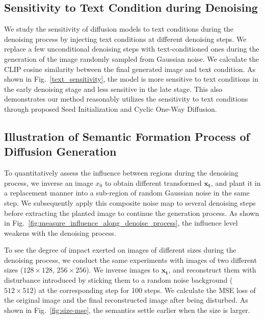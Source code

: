 \subsection{Sensitivity to Text Condition during Denoising}\label{sec:text-sensitivity}
We study the sensitivity of diffusion models to text conditions during the denoising process by injecting text conditions at different denoising steps. We replace a few unconditional denoising steps with text-conditioned ones during the generation of the image randomly sampled from Gaussian noise. We calculate the CLIP cosine similarity between the final generated image and text condition. As shown in Fig.~\ref{text_sensitivity}, the model is more sensitive to text conditions in the early denoising stage and less sensitive in the late stage. This also demonstrates our method reasonably utilizes the sensitivity to text conditions through proposed Seed Initialization and Cyclic One-Way Diffusion.

\subsection{Illustration of Semantic Formation Process of Diffusion Generation}\label{sec:diff-size_semantic_formation}

To quantitatively assess the influence between regions during the denoising process, we inverse an image $x_0$ to obtain different transformed $\mathbf{x_t}$, and plant it in a replacement manner into a sub-region of random Gaussian noise in the same step. We subsequently apply this composite noise map to several denoising steps before extracting the planted image to continue the generation process. As shown in Fig.~\ref{fig:measure_influence_along_denoise_process}, the influence level weakens with the denoising process. 

To see the degree of impact exerted on images of different sizes during the denoising process, we conduct the same experiments with images of two different sizes ($128\times128$, $256\times256$). We inverse images to $\mathbf{x_t}$, and reconstruct them with disturbance introduced by sticking them to a random noise background ($512 \times 512$) at the corresponding step for 100 steps. We calculate the MSE loss of the original image and the final reconstructed image after being disturbed. As shown in Fig.~\ref{fig:size-mse}, the semantics settle earlier when the size is larger.

